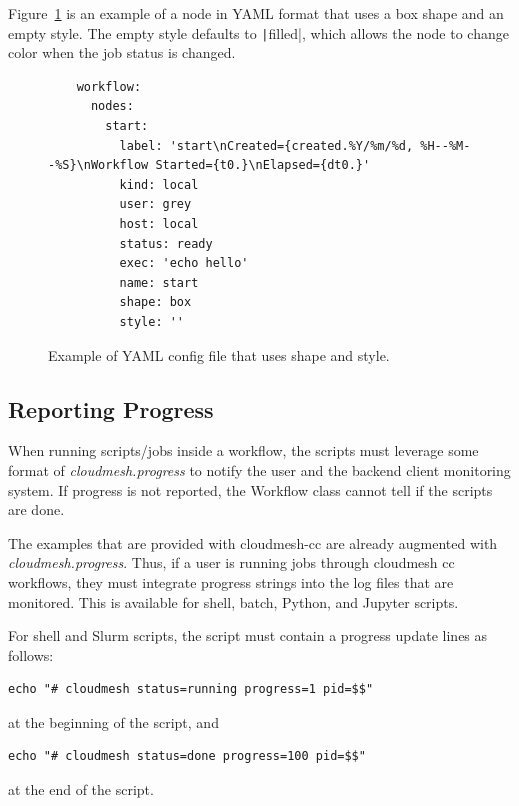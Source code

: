 Figure~\ref{fig:shape-style-yaml} is an example of a node in YAML
format that uses a box shape and an empty style. The empty style
defaults to \texttt|filled|, which allows the node to change
color when the job status is changed.

\begin{figure}
    \begin{verbatim}
    workflow:
      nodes:
        start:
          label: 'start\nCreated={created.%Y/%m/%d, %H--%M--%S}\nWorkflow Started={t0.}\nElapsed={dt0.}'
          kind: local
          user: grey
          host: local
          status: ready
          exec: 'echo hello'
          name: start
          shape: box
          style: ''
    \end{verbatim}
    \caption{Example of YAML config file that uses shape and style.}
    \label{fig:shape-style-yaml}
\end{figure}



\subsection{Reporting Progress}\label{reporting-progress}

When running scripts/jobs inside a workflow, the scripts must leverage
some format of {\em cloudmesh.progress} to notify the user and the
backend client monitoring system. If progress is not reported, the
Workflow class cannot tell if the scripts are done.

The examples that are provided with cloudmesh-cc are already augmented
with {\em cloudmesh.progress}. Thus, if a user is running jobs through
cloudmesh cc workflows, they must integrate progress strings into the
log files that are monitored. This is available for shell, batch,
Python, and Jupyter scripts.

For shell and Slurm scripts, the script must contain a progress update
lines as follows:

\begin{verbatim}
echo "# cloudmesh status=running progress=1 pid=$$"
\end{verbatim}

at the beginning of the script, and

\begin{verbatim}
echo "# cloudmesh status=done progress=100 pid=$$"
\end{verbatim}

at the end of the script.

